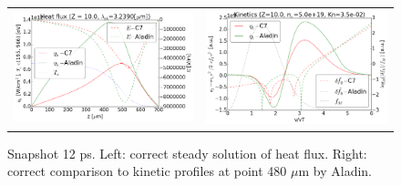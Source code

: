 \begin{figure}[tbh]
  \begin{center}
    \begin{tabular}{cc}
      \includegraphics[width=\figscale\textwidth]{../VFPdata/C7_Aladin_case4_heatflux.png} & 
      \includegraphics[width=\figscale\textwidth]{../VFPdata/C7_Aladin_case4_kinetics.png}
    \end{tabular}
  \caption{  
  Snapshot 12 ps. Left: correct steady solution of heat flux. Right: correct comparison to kinetic profiles at point 480 $\mu$m by Aladin.
  }
  \end{center}
  \label{fig:C7_Aladin_case4}
\end{figure}

\clearpage
